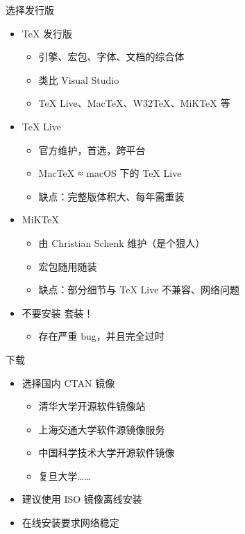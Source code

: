 \begin{frame}{选择发行版}
\begin{itemize}
  \item \TeX{} 发行版

    \begin{itemize}
      \item 引擎、宏包、字体、文档的综合体
      \item 类比 Visual Studio
      \item \TeX{} Live、Mac\TeX{}、W32\TeX{}、MiK\TeX{} 等
    \end{itemize} \pause

  \item \TeX{} Live 

    \begin{itemize}
      \item 官方维护，首选，跨平台
      \item Mac\TeX{} ≈ macOS 下的 \TeX{} Live
      \item 缺点：完整版体积大、每年需重装
    \end{itemize}

  \item MiK\TeX{} 

    \begin{itemize}
      \item 由 Christian Schenk 维护（是个狠人）
      \item 宏包随用随装
      \item 缺点：部分细节与 \TeX{} Live 不兼容、网络问题
    \end{itemize} \pause

  \item \alert{不要安装 \CTeX{} 套装！}

    \begin{itemize}
      \item \alert{存在严重 bug，并且完全过时}
    \end{itemize}
\end{itemize}
\end{frame}

\begin{frame}{下载}
\begin{itemize}
  \item 选择国内 CTAN 镜像

    \begin{itemize}
      \item 清华大学开源软件镜像站 
      \item 上海交通大学软件源镜像服务 
      \item 中国科学技术大学开源软件镜像  \pause
      \item 复旦大学……
    \end{itemize} \pause

  \item 建议使用 ISO 镜像离线安装
  \item 在线安装要求网络稳定
\end{itemize}
\end{frame}

